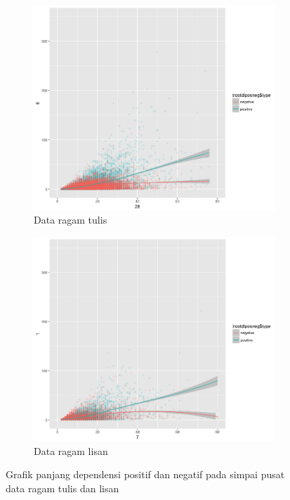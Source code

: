 \begin{figure}
\centering

\begin{subfigure}{.8\linewidth}
  \centering
  \includegraphics[width=1\linewidth] {pics/tulisroot_DLposneg.png} 
	\caption{Data ragam tulis}
	\label{fig:tulisroot_DLposneg} 
\end{subfigure}
%
\begin{subfigure}{.8\linewidth}
  \centering
  \includegraphics[width=1\linewidth]{pics/lisanroot_DLposneg.png} 
	\caption{Data ragam lisan}
	\label{fig:lisanroot_DLposneg} 
\end{subfigure}

\caption{Grafik panjang dependensi positif dan negatif pada simpai pusat data ragam tulis dan lisan}
\label{fig:rootDL_posneg}
\end{figure}

